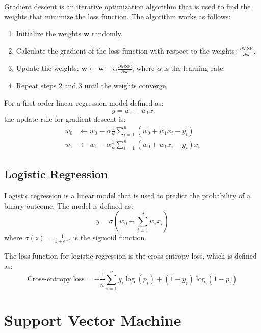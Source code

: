 \documentclass[a4paper,12pt]{article}
\begin{document}
Gradient descent is an iterative optimization algorithm that is used to find the weights that minimize the loss function. The algorithm works as follows:
\begin{enumerate}
  \item Initialize the weights $\mathbf{w}$ randomly.
  \item Calculate the gradient of the loss function with respect to the weights: $\frac{\partial \text{MSE}}{\partial \mathbf{w}}$.
  \item Update the weights: $\mathbf{w} \gets \mathbf{w} - \alpha \frac{\partial \text{MSE}}{\partial \mathbf{w}}$, where $\alpha$ is the learning rate.
  \item Repeat steps 2 and 3 until the weights converge.
\end{enumerate}

\begin{examplebox}
  For a first order linear regression model defined as:
  \begin{equation*}
    y = w_0 + w_1 x
  \end{equation*}
  the update rule for gradient descent is:
  \begin{align*}
    w_0 &\gets w_0 - \alpha \frac{1}{n} \sum_{i=1}^{n} (w_0 + w_1 x_i - y_i) \\
    w_1 &\gets w_1 - \alpha \frac{1}{n} \sum_{i=1}^{n} (w_0 + w_1 x_i - y_i) x_i
  \end{align*}
\end{examplebox}

\subsection{Logistic Regression}

Logistic regression is a linear model that is used to predict the probability of a binary outcome. The model is defined as:
\begin{equation*}
  y = \sigma(w_0 + \sum_{i=1}^{d} w_i x_i)
\end{equation*}
where $\sigma(z) = \frac{1}{1 + e^{-z}}$ is the sigmoid function.

The loss function for logistic regression is the cross-entropy loss, which is defined as:
\begin{equation*}
  \text{Cross-entropy loss} = -\frac{1}{n} \sum_{i=1}^{n} y_i \log(p_i) + (1 - y_i) \log(1 - p_i)
\end{equation*}

\section{Support Vector Machine}
\end{document}
